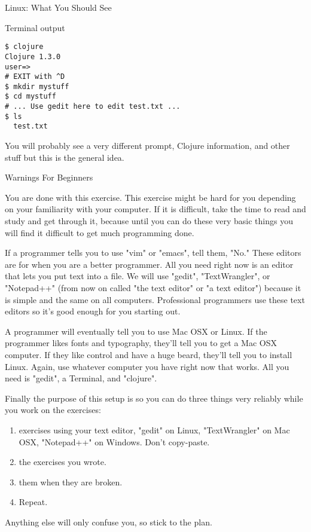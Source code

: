 {\large Linux: What You Should See}
	
\begin{code}{Terminal output}
\begin{Verbatim}
$ clojure
Clojure 1.3.0
user=> 
# EXIT with ^D
$ mkdir mystuff
$ cd mystuff
# ... Use gedit here to edit test.txt ...
$ ls
  test.txt
\end{Verbatim}
\end{code}

	
You will probably see a very different prompt, Clojure information, and other stuff but this is the general idea.
	

{\Large Warnings For Beginners}
	
You are done with this exercise.  This exercise might be hard for you
depending on your familiarity with your computer.  If it is difficult,
take the time to read and study and get through it, because until you can do
these very basic things you will find it difficult to get much programming done.
	
If a programmer tells you to use "vim" or "emacs", tell them, "No."  These
editors are for when you are a better programmer.  All you need right now is an
editor that lets you put text into a file.  We will use "gedit",
"TextWrangler", or "Notepad++" (from now on called "the text editor" or "a
text editor") because it is simple and the same on all computers.  Professional
programmers use these text editors so it's good enough for you starting out.
	
A programmer will eventually tell you to use Mac OSX or Linux.  If the programmer
likes fonts and typography, they'll tell you to get a Mac OSX computer.  If they
like control and have a huge beard, they'll tell you to install Linux.  Again,
use whatever computer you have right now that works.  All you need is "gedit",
a Terminal, and "clojure".
	
Finally the purpose of this setup is so you can do three things very reliably
while you work on the exercises:
	
\begin{enumerate}
\item {} exercises using your text editor, "gedit" on Linux, "TextWrangler" on Mac OSX, "Notepad++" on Windows. Don't copy-paste.
\item {} the exercises you wrote.
\item {} them when they are broken.
\item Repeat.
\end{enumerate}
	
Anything else will only confuse you, so stick to the plan.